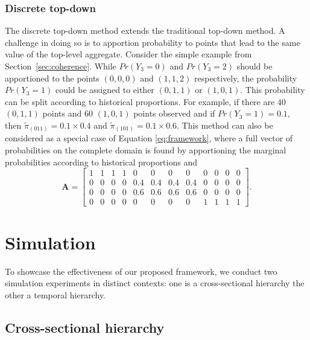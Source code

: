 \documentclass[a4paper,review,12pt,authoryear]{elsarticle}
\theoremstyle{definition}
\begin{document}
    \subsubsection*{\textbf{Discrete top-down}}

    The discrete top-down method extends the traditional top-down method. A challenge in doing so is to apportion probability to points that lead to the same value of the top-level aggregate. Consider the simple example from Section~\ref{sec:coherence}. While $Pr(Y_3=0)$ and $Pr(Y_3=2)$ should be apportioned to the points $(0,0,0)$ and $(1,1,2)$ respectively, the probability $Pr(Y_3=1)$ could be assigned to either $(0,1,1)$ or $(1,0,1)$. This probability can be split according to historical proportions. For example, if there are $40$ $(0, 1, 1)$ points and $60$ $(1, 0, 1) $ points observed and if  $Pr(Y_3=1) = 0.1$, then $\tilde \pi_{(011)} = 0.1\times 0.4$ and $\tilde \pi_{(101)} = 0.1\times 0.6$.
    This method can also be considered as a special case of Equation \eqref{eq:framework}, where a full vector of probabilities on the complete domain is found by apportioning the marginal probabilities according to historical proportions and
    \[
    \mathbf{A} = \left[\begin{matrix}
      1 & 1 & 1 & 1 & 0 & 0 & 0 & 0 & 0 & 0 & 0 & 0 \\
      0 & 0 & 0 & 0 & 0.4 & 0.4 & 0.4 & 0.4 & 0 & 0 & 0 & 0 \\
      0 & 0 & 0 & 0 & 0.6 & 0.6 & 0.6 & 0.6 & 0 & 0 & 0 & 0 \\
      0 & 0 & 0 & 0 & 0 & 0 & 0 & 0 & 1 & 1 & 1 & 1
    \end{matrix}\right].
    \]

\section{Simulation}
\label{sec:simulation}

To showcase the effectiveness of our proposed framework, we conduct two simulation experiments in distinct contexts: one is a cross-sectional hierarchy the other a temporal hierarchy.

  \subsection{Cross-sectional hierarchy}
  \label{sec:cross-sectional_simu}
\end{document}
